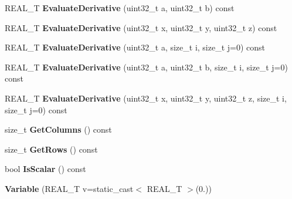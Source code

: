 \begin{DoxyCompactItemize}
\item 
\hypertarget{structatl_1_1_variable_ae0e92ce16a480a08f19cbba21d784540}{R\+E\+A\+L\+\_\+\+T {\bfseries Evaluate\+Derivative} (uint32\+\_\+t a, uint32\+\_\+t b) const }\label{structatl_1_1_variable_ae0e92ce16a480a08f19cbba21d784540}

\item 
\hypertarget{structatl_1_1_variable_a2d32c28f89eebef1d11430548e15fb60}{R\+E\+A\+L\+\_\+\+T {\bfseries Evaluate\+Derivative} (uint32\+\_\+t x, uint32\+\_\+t y, uint32\+\_\+t z) const }\label{structatl_1_1_variable_a2d32c28f89eebef1d11430548e15fb60}

\item 
\hypertarget{structatl_1_1_variable_a231e419a98a1ae0eef903cd25c8cc025}{R\+E\+A\+L\+\_\+\+T {\bfseries Evaluate\+Derivative} (uint32\+\_\+t a, size\+\_\+t i, size\+\_\+t j=0) const }\label{structatl_1_1_variable_a231e419a98a1ae0eef903cd25c8cc025}

\item 
\hypertarget{structatl_1_1_variable_a05cda7ab0ee9d700edb57cb5c1768005}{R\+E\+A\+L\+\_\+\+T {\bfseries Evaluate\+Derivative} (uint32\+\_\+t a, uint32\+\_\+t b, size\+\_\+t i, size\+\_\+t j=0) const }\label{structatl_1_1_variable_a05cda7ab0ee9d700edb57cb5c1768005}

\item 
\hypertarget{structatl_1_1_variable_a31574d4c65eca8ad0e1553525f568ca5}{R\+E\+A\+L\+\_\+\+T {\bfseries Evaluate\+Derivative} (uint32\+\_\+t x, uint32\+\_\+t y, uint32\+\_\+t z, size\+\_\+t i, size\+\_\+t j=0) const }\label{structatl_1_1_variable_a31574d4c65eca8ad0e1553525f568ca5}

\item 
\hypertarget{structatl_1_1_variable_a8014f00f3b2233bf46a83395e1bb9d79}{size\+\_\+t {\bfseries Get\+Columns} () const }\label{structatl_1_1_variable_a8014f00f3b2233bf46a83395e1bb9d79}

\item 
\hypertarget{structatl_1_1_variable_a92ae914f1792b5cdc2abc3c8a5f1e4d2}{size\+\_\+t {\bfseries Get\+Rows} () const }\label{structatl_1_1_variable_a92ae914f1792b5cdc2abc3c8a5f1e4d2}

\item 
\hypertarget{structatl_1_1_variable_a0e6e6a7b6dd2cc83d170beccbe900d36}{bool {\bfseries Is\+Scalar} () const }\label{structatl_1_1_variable_a0e6e6a7b6dd2cc83d170beccbe900d36}

\item 
\hypertarget{structatl_1_1_variable_a0089f2d112ea67897ac2e23033686279}{{\bfseries Variable} (R\+E\+A\+L\+\_\+\+T v=static\+\_\+cast$<$ R\+E\+A\+L\+\_\+\+T $>$(0.))}\label{structatl_1_1_variable_a0089f2d112ea67897ac2e23033686279}


\end{DoxyCompactItemize}
